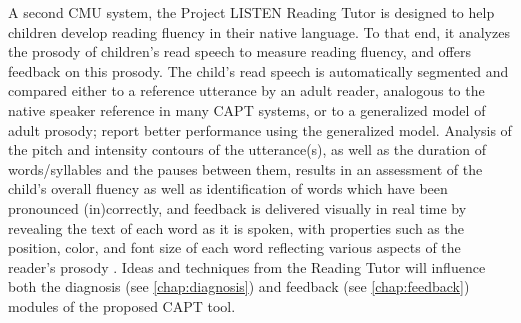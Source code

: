 	A second CMU system, the Project LISTEN Reading Tutor \citep{Mostow2012} 
is designed to help children develop reading fluency in their native language. 
To that end, 
it analyzes the prosody of children's read speech to measure reading fluency, and offers feedback on this prosody. %
	The child's read speech is automatically segmented and compared either to a reference utterance by an adult reader, analogous to the native speaker reference in many CAPT systems, or to a generalized model of adult prosody; \textcite{Duong2011} report better performance using the generalized model. Analysis of the pitch and intensity contours of the utterance(s), as well as the duration of words/syllables and the pauses between them, results in an assessment of the child's overall fluency as well as identification of words which have been pronounced (in)correctly, and feedback is delivered visually in real time by revealing the text of each word as it is spoken, with properties such as the position, color, and font size of each word reflecting various aspects of the reader's prosody \citep{Sitaram2011}. Ideas and techniques from the Reading Tutor will influence both the diagnosis (see \cref{chap:diagnosis}) and feedback (see \cref{chap:feedback}) modules of the proposed CAPT tool. %
	
